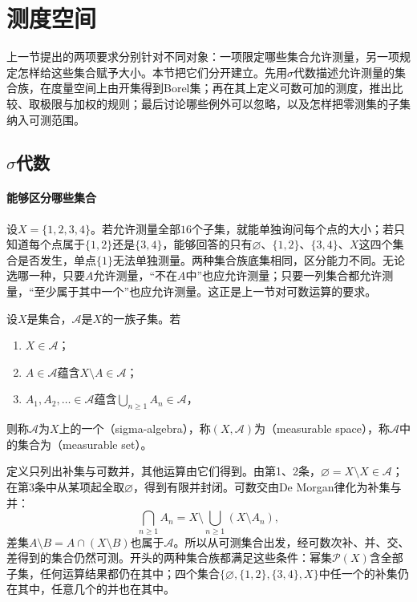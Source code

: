 \section{测度空间}
\label{sec:measure-spaces-def}

上一节提出的两项要求分别针对不同对象：一项限定哪些集合允许测量，另一项规定怎样给这些集合赋予大小。本节把它们分开建立。先用$\sigma$代数描述允许测量的集合族，在度量空间上由开集得到Borel集；再在其上定义可数可加的测度，推出比较、取极限与加权的规则；最后讨论哪些例外可以忽略，以及怎样把零测集的子集纳入可测范围。

\subsection{$\sigma$代数}
\label{sec:measure-sigma-algebras}

\paragraph{能够区分哪些集合}
设$X=\{1,2,3,4\}$。若允许测量全部$16$个子集，就能单独询问每个点的大小；若只知道每个点属于$\{1,2\}$还是$\{3,4\}$，能够回答的只有$\varnothing$、$\{1,2\}$、$\{3,4\}$、$X$这四个集合是否发生，单点$\{1\}$无法单独测量。两种集合族底集相同，区分能力不同。无论选哪一种，只要$A$允许测量，“不在$A$中”也应允许测量；只要一列集合都允许测量，“至少属于其中一个”也应允许测量。这正是上一节对可数运算的要求。

\begin{definition}[$\sigma$代数]
\label{def:measure-sigma-algebra}
设$X$是集合，$\mathcal A$是$X$的一族子集。若
\begin{enumerate}
 \item $X\in\mathcal A$；
 \item $A\in\mathcal A$蕴含$X\setminus A\in\mathcal A$；
 \item $A_1,A_2,\dots\in\mathcal A$蕴含$\bigcup_{n\ge1}A_n\in\mathcal A$，
\end{enumerate}
则称$\mathcal A$为$X$上的一个（sigma-algebra），称$(X,\mathcal A)$为（measurable space），称$\mathcal A$中的集合为（measurable set）。
\end{definition}

定义只列出补集与可数并，其他运算由它们得到。由第1、2条，$\varnothing=X\setminus X\in\mathcal A$；在第3条中从某项起全取$\varnothing$，得到有限并封闭。可数交由De Morgan律化为补集与并：
\[
 \bigcap_{n\ge1}A_n=X\setminus\bigcup_{n\ge1}(X\setminus A_n),
\]
差集$A\setminus B=A\cap(X\setminus B)$也属于$\mathcal A$。所以从可测集合出发，经可数次补、并、交、差得到的集合仍然可测。开头的两种集合族都满足这些条件：幂集$\mathcal P(X)$含全部子集，任何运算结果都仍在其中；四个集合$\{\varnothing,\{1,2\},\{3,4\},X\}$中任一个的补集仍在其中，任意几个的并也在其中。

